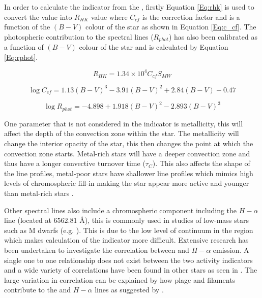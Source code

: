 In order to calculate the \Rprime indicator from the \Smw, firstly Equation \ref{Eq:rhk} is used to convert the \Smw value into $R_{HK}$ value where $C_{cf}$ is the correction factor and is a function of the $(B-V)$ colour of the star as shown in Equation \ref{Eq:c_cf}. The photospheric contribution to the \caII spectral lines ($R_{phot}$) has also been calibrated as a function of $(B-V)$ colour of the star and is calculated by Equation \ref{Eq:rphot}.

\begin{equation}
    R_{HK} = 1.34{\times}10^{4}C_{cf}S_{MW}
    \label{Eq:rhk}
\end{equation}

\begin{equation}
    \log C_{cf} = 1.13(B - V)^{3} - 3.91(B-V)^{2} + 2.84(B-V) - 0.47
    \label{Eq:c_cf}
\end{equation}

\begin{equation}
    \log R_{phot} = -4.898 + 1.918(B-V)^{2} - 2.893(B-V)^{3}
    \label{Eq:rphot}
\end{equation}

One parameter that is not considered in the \Rprime indicator is metallicity, this will affect the depth of the convection zone within the star. The metallicity will change the interior opacity of the star, this then changes the point at which the convection zone starts. Metal-rich stars will have a deeper convection zone and thus have a longer convective turnover time ($\tau_{C}$). This also affects the shape of the \caII line profiles, metal-poor stars have shallower line profiles which mimics high levels of chromospheric fill-in making the star appear more active and younger than metal-rich stars \citep{Rocha-Pinto_Maciel_1998}.

Other spectral lines also include a chromospheric component including the $H-\alpha$ line (located at 6562.81 \AA), this is commonly used in studies of low-mass stars such as M dwarfs (e.g. \citealt{Newton_etal_2017}). This is due to the low level of continuum in the \caII region which makes calculation of the \Rprime indicator more difficult. Extensive research has been undertaken to investigate the correlation between \caII and $H-\alpha$ emission. A single one to one relationship does not exist between the two activity indicators and a wide variety of correlations have been found in other stars as seen in \citet{Cincunegui_etal_2007}. The large variation in correlation can be explained by how plage and filaments contribute to the \caII and $H-\alpha$ lines as suggested by \citet{Meunier_Delfosse_2009}.

